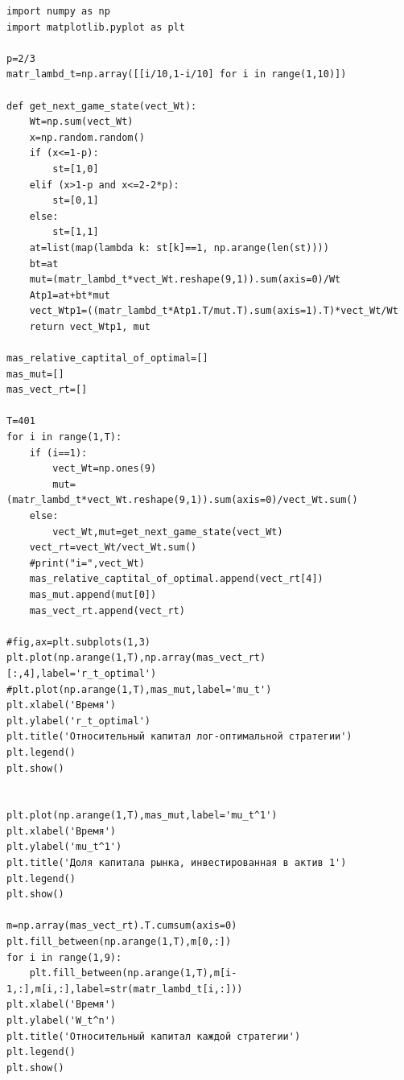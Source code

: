 \documentclass[a4paper,12pt,russian]{article} %
\theoremstyle{definition}
\begin{document}
 \begin{verbatim}
import numpy as np
import matplotlib.pyplot as plt

p=2/3
matr_lambd_t=np.array([[i/10,1-i/10] for i in range(1,10)])

def get_next_game_state(vect_Wt):
    Wt=np.sum(vect_Wt)
    x=np.random.random()
    if (x<=1-p):
        st=[1,0]
    elif (x>1-p and x<=2-2*p):
        st=[0,1]
    else:
        st=[1,1]
    at=list(map(lambda k: st[k]==1, np.arange(len(st))))
    bt=at
    mut=(matr_lambd_t*vect_Wt.reshape(9,1)).sum(axis=0)/Wt
    Atp1=at+bt*mut
    vect_Wtp1=((matr_lambd_t*Atp1.T/mut.T).sum(axis=1).T)*vect_Wt/Wt
    return vect_Wtp1, mut

mas_relative_captital_of_optimal=[]
mas_mut=[]
mas_vect_rt=[]

T=401
for i in range(1,T):
    if (i==1):
        vect_Wt=np.ones(9)
        mut=(matr_lambd_t*vect_Wt.reshape(9,1)).sum(axis=0)/vect_Wt.sum()
    else:
        vect_Wt,mut=get_next_game_state(vect_Wt)
    vect_rt=vect_Wt/vect_Wt.sum()
    #print("i=",vect_Wt)
    mas_relative_captital_of_optimal.append(vect_rt[4])
    mas_mut.append(mut[0])
    mas_vect_rt.append(vect_rt)
    
#fig,ax=plt.subplots(1,3)
plt.plot(np.arange(1,T),np.array(mas_vect_rt)[:,4],label='r_t_optimal')
#plt.plot(np.arange(1,T),mas_mut,label='mu_t')
plt.xlabel('Время')
plt.ylabel('r_t_optimal')
plt.title('Относительный капитал лог-оптимальной стратегии')
plt.legend()
plt.show()


plt.plot(np.arange(1,T),mas_mut,label='mu_t^1')
plt.xlabel('Время')
plt.ylabel('mu_t^1')
plt.title('Доля капитала рынка, инвестированная в актив 1')
plt.legend()
plt.show()

m=np.array(mas_vect_rt).T.cumsum(axis=0)
plt.fill_between(np.arange(1,T),m[0,:])
for i in range(1,9):
    plt.fill_between(np.arange(1,T),m[i-1,:],m[i,:],label=str(matr_lambd_t[i,:]))
plt.xlabel('Время')
plt.ylabel('W_t^n')
plt.title('Относительный капитал каждой стратегии')
plt.legend()
plt.show()

 \end{verbatim}

 
\end{document}
